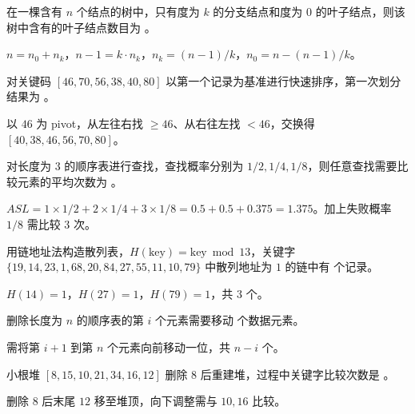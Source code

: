 \begin{question}
在一棵含有 $n$ 个结点的树中，只有度为 $k$ 的分支结点和度为 $0$ 的叶子结点，则该树中含有的叶子结点数目为 \underline{\hspace{4em}}。
\begin{solution}
$n=n_0+n_k$，$n-1=k\cdot n_k$，$n_k=(n-1)/k$，$n_0=n-(n-1)/k$。
\end{solution}
\end{question}

\begin{question}
对关键码 $[46,70,56,38,40,80]$ 以第一个记录为基准进行快速排序，第一次划分结果为 \underline{\hspace{4em}}。
\begin{solution}
以 $46$ 为 pivot，从左往右找 $\ge46$、从右往左找 $<46$，交换得 $[40,38,46,56,70,80]$。
\end{solution}
\end{question}

\begin{question}
对长度为 $3$ 的顺序表进行查找，查找概率分别为 $1/2,1/4,1/8$，则任意查找需要比较元素的平均次数为 \underline{\hspace{4em}}。
\begin{solution}
$ASL=1\times1/2+2\times1/4+3\times1/8=0.5+0.5+0.375=1.375$。加上失败概率 $1/8$ 需比较 $3$ 次。
\end{solution}
\end{question}

\begin{question}
用链地址法构造散列表，$H(\text{key})=\text{key}\bmod13$，关键字 $\{19,14,23,1,68,20,84,27,55,11,10,79\}$ 中散列地址为 $1$ 的链中有 \underline{\hspace{4em}} 个记录。
\begin{solution}
$H(14)=1$，$H(27)=1$，$H(79)=1$，共 $3$ 个。
\end{solution}
\end{question}

\begin{question}
删除长度为 $n$ 的顺序表的第 $i$ 个元素需要移动 \underline{\hspace{4em}} 个数据元素。
\begin{solution}
需将第 $i+1$ 到第 $n$ 个元素向前移动一位，共 $n-i$ 个。
\end{solution}
\end{question}

\begin{question}
小根堆 $[8,15,10,21,34,16,12]$ 删除 $8$ 后重建堆，过程中关键字比较次数是 \underline{\hspace{4em}}。
\begin{solution}
删除 $8$ 后末尾 $12$ 移至堆顶，向下调整需与 $10,16$ 比较。
\end{solution}
\end{question}

